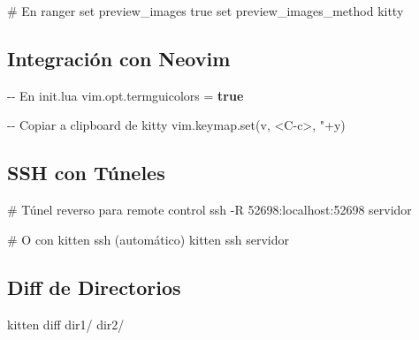 \documentclass[
  doc,
  floatsintext,
  longtable,
  a4paper,
  nolmodern,
  notxfonts,
  notimes,
  12pt,
  colorlinks=true,linkcolor=blue,citecolor=blue,urlcolor=blue]{apa7}
\newenvironment{Shaded}{\begin{snugshade}}{\end{snugshade}}
\newcommand{\AttributeTok}[1]{\textcolor[rgb]{0.40,0.45,0.13}{#1}}
\newcommand{\BuiltInTok}[1]{\textcolor[rgb]{0.00,0.23,0.31}{#1}}
\newcommand{\CommentTok}[1]{\textcolor[rgb]{0.37,0.37,0.37}{#1}}
\newcommand{\ExtensionTok}[1]{\textcolor[rgb]{0.00,0.23,0.31}{#1}}
\newcommand{\FunctionTok}[1]{\textcolor[rgb]{0.28,0.35,0.67}{#1}}
\newcommand{\KeywordTok}[1]{\textcolor[rgb]{0.00,0.23,0.31}{\textbf{#1}}}
\newcommand{\NormalTok}[1]{\textcolor[rgb]{0.00,0.23,0.31}{#1}}
\newcommand{\OperatorTok}[1]{\textcolor[rgb]{0.37,0.37,0.37}{#1}}
\newcommand{\StringTok}[1]{\textcolor[rgb]{0.13,0.47,0.30}{#1}}
\newcommand{\VariableTok}[1]{\textcolor[rgb]{0.07,0.07,0.07}{#1}}
\begin{document}
\begin{Shaded}
\begin{Highlighting}[]
\CommentTok{\# En ranger}
\BuiltInTok{set}\NormalTok{ preview\_images true}
\BuiltInTok{set}\NormalTok{ preview\_images\_method kitty}
\end{Highlighting}
\end{Shaded}

\subsection{Integración con Neovim}\label{integraciuxf3n-con-neovim}

\begin{Shaded}
\begin{Highlighting}[]
\CommentTok{{-}{-} En init.lua}
\VariableTok{vim}\OperatorTok{.}\VariableTok{opt}\OperatorTok{.}\VariableTok{termguicolors} \OperatorTok{=} \KeywordTok{true}

\CommentTok{{-}{-} Copiar a clipboard de kitty}
\VariableTok{vim}\OperatorTok{.}\VariableTok{keymap}\OperatorTok{.}\NormalTok{set}\OperatorTok{(}\StringTok{\textquotesingle{}v\textquotesingle{}}\OperatorTok{,} \StringTok{\textquotesingle{}\textless{}C{-}c\textgreater{}\textquotesingle{}}\OperatorTok{,} \StringTok{\textquotesingle{}"+y\textquotesingle{}}\OperatorTok{)}
\end{Highlighting}
\end{Shaded}

\subsection{SSH con Túneles}\label{ssh-con-tuxfaneles}

\begin{Shaded}
\begin{Highlighting}[]
\CommentTok{\# Túnel reverso para remote control}
\FunctionTok{ssh} \AttributeTok{{-}R}\NormalTok{ 52698:localhost:52698 servidor}

\CommentTok{\# O con kitten ssh (automático)}
\ExtensionTok{kitten}\NormalTok{ ssh servidor}
\end{Highlighting}
\end{Shaded}

\subsection{Diff de Directorios}\label{diff-de-directorios}

\begin{Shaded}
\begin{Highlighting}[]
\ExtensionTok{kitten}\NormalTok{ diff dir1/ dir2/}
\end{Highlighting}
\end{Shaded}
\end{document}
